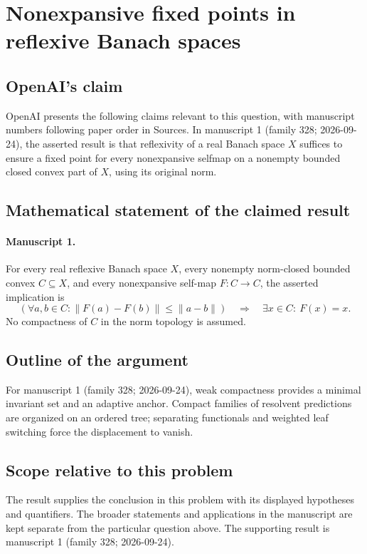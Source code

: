 \documentclass[11pt]{article}
\begin{document}
\section*{Nonexpansive fixed points in reflexive Banach spaces}

\subsection{OpenAI's claim}
OpenAI presents the following claims relevant to this question, with manuscript numbers following paper order in Sources. In manuscript 1 (family 328; 2026-09-24), the asserted result is that reflexivity of a real Banach space $X$ suffices to ensure a fixed point for every nonexpansive selfmap on a nonempty bounded closed convex part of $X$, using its original norm.

\subsection{Mathematical statement of the claimed result}
\paragraph{Manuscript 1.}
For every real reflexive Banach space $X$, every nonempty norm-closed bounded convex $C\subseteq X$, and every nonexpansive self-map $F:C\to C$, the asserted implication is
\[
 (\forall a,b\in C:\|F(a)-F(b)\|\le\|a-b\|)
 \quad\Longrightarrow\quad\exists x\in C:\ F(x)=x.
\]
No compactness of $C$ in the norm topology is assumed.

\subsection{Outline of the argument}
For manuscript 1 (family 328; 2026-09-24), weak compactness provides a minimal invariant set and an adaptive anchor. Compact families of resolvent predictions are organized on an ordered tree; separating functionals and weighted leaf switching force the displacement to vanish.

\subsection{Scope relative to this problem}
The result supplies the conclusion in this problem with its displayed hypotheses and quantifiers. The broader statements and applications in the manuscript are kept separate from the particular question above. The supporting result is manuscript 1 (family 328; 2026-09-24).
\end{document}
